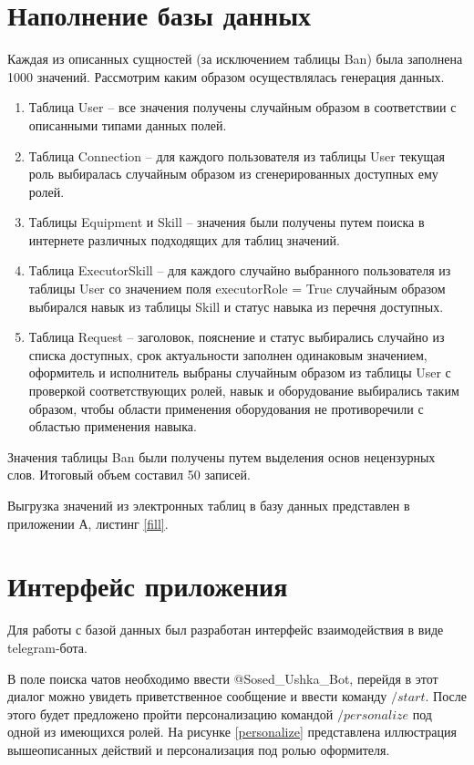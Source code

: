 \section{Наполнение базы данных}

Каждая из описанных сущностей (за исключением таблицы Ban) была заполнена 1000 значений. Рассмотрим каким образом осуществлялась генерация данных.
\begin{enumerate}
	\item Таблица User -- все значения получены случайным образом в соответствии с описанными типами данных полей.
	\item Таблица Connection -- для каждого пользователя из таблицы User текущая роль выбиралась случайным образом из сгенерированных доступных ему ролей.
	\item Таблицы Equipment и Skill -- значения были получены путем поиска в интернете различных подходящих для таблиц значений.
	\item Таблица ExecutorSkill -- для каждого случайно выбранного пользователя из таблицы User со значением поля executorRole = True случайным образом выбирался навык из таблицы Skill и статус навыка из перечня доступных.
	\item Таблица Request -- заголовок, пояснение и статус выбирались случайно из списка доступных, срок актуальности заполнен одинаковым значением, оформитель и исполнитель выбраны случайным образом из таблицы User с проверкой соответствующих ролей, навык и оборудование выбирались таким образом, чтобы области применения оборудования не противоречили с областью применения навыка.
\end{enumerate}

Значения таблицы Ban были получены путем выделения основ нецензурных слов. Итоговый объем составил 50 записей. 

Выгрузка значений из электронных таблиц в базу данных представлен в приложении А, листинг \ref{fill}.

\section{Интерфейс приложения}

Для работы с базой данных был разработан интерфейс взаимодействия в виде telegram-бота. 

В поле поиска чатов необходимо ввести @Sosed\_Ushka\_Bot, перейдя в этот диалог можно увидеть приветственное сообщение и ввести команду $/start$. После этого будет предложено пройти персонализацию командой $/personalize$ под одной из имеющихся ролей. На рисунке \ref{personalize} представлена иллюстрация вышеописанных действий и персонализация под ролью оформителя.

